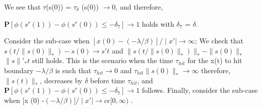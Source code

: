 \newline We see that $\tau$(s(0)) = $\tau _\delta$ (s(0)) $\rightarrow 0$, and therefore, \begin{center} $\mathbf{P}[\phi(s ^r(1)) - \phi(s ^r (0)) \leq - \delta_7] \rightarrow  1 $ holds with $\delta_7$ = $\delta$.\end{center}	
Consider the sub-case when $[x(0) - (-\lambda / \beta)]/\mid x \prime \mid \rightarrow \infty $; 
\newline \newline We check that $s(t/\|s(0)\|_\ast) - s(0)\rightarrow s\prime t $ and $ \|s(t/\|s(0)\|_\ast)\|_\ast - \| s(0)\|_\ast $ \rightarrow $\|s\|\prime_\ast t $ still holds. This is the scenario when the time $\tau _{hit}$ for the x(t) to hit boundary $-\lambda/ \beta$ is such that $\tau_{hit} \rightarrow 0$ and $\tau_{hit} \|s(0)\|_\ast \rightarrow \infty $ therefore,$ \|s(t)\|_\ast$, decreases by $\delta$ before time $\tau_{hit}$, and $\mathbf{P}[\phi(s ^r(1)) - \phi(s ^r (0)) \leq - \delta_7] \rightarrow  1 $ follows.
\newline \newline Finally, consider the sub-case when [x (0) -$(-\lambda/ \beta)] /\mid x\prime \mid \rightarrow c  \epsilon [ 0 , \infty )$ . 


